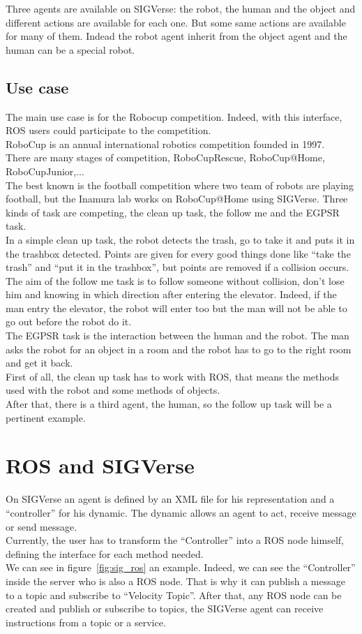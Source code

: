Three agents are available on SIGVerse: the robot, the human and the object and different actions are available for each one. But some same actions are available for many of them. Indead the robot agent inherit from the object agent and the human can be a special robot.

\subsection{Use case}
The main use case is for the Robocup competition. Indeed, with this interface, ROS users could participate to the competition.\\
RoboCup is an annual international robotics competition founded in 1997.\\
There are many stages of competition, RoboCupRescue, RoboCup@Home, RoboCupJunior,...\\
The best known is the football competition where two team of robots are playing football, but the Inamura lab works on RoboCup@Home using SIGVerse. Three kinds of task are competing, the clean up task, the follow me and the EGPSR task.\\
In a simple clean up task, the robot detects the trash, go to take it and puts it in the trashbox detected. Points are given for every good things done like ``take the trash'' and ``put it in the trashbox'', but points are removed if a collision occurs.\\
The aim of the follow me task is to follow someone without collision, don't lose him and knowing in which direction after entering the elevator. Indeed, if the man entry the elevator, the robot will enter too but the man will not be able to go out before the robot do it.\\
The EGPSR task is the interaction between the human and the robot. The man asks the robot for an object in a room and the robot has to go to the right room and get it back.\\
First of all, the clean up task has to work with ROS, that means the methods used with the robot and some methods of objects.\\
After that, there is a third agent, the human, so the follow up task will be a pertinent example.
 

\section{ROS and SIGVerse}
On SIGVerse an agent is defined by an XML file for his representation and a ``controller'' for his dynamic. The dynamic allows an agent to act, receive message or send message.\\
Currently, the user has to transform the ``Controller'' into a ROS node himself, defining the interface for each method needed.\\
We can see in figure~\ref{fig:sig_ros} an example. Indeed, we can see the ``Controller'' inside the server who is also a ROS node. That is why it can publish a message to a topic and subscribe to ``Velocity Topic''. After that, any ROS node can be created and publish or subscribe to topics, the SIGVerse agent can receive instructions from a topic or a service.\\

